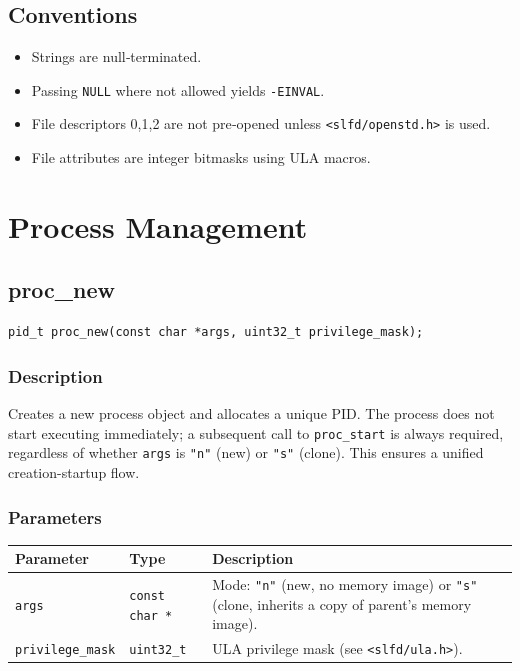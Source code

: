 \documentclass[12pt,a4paper]{article}
\begin{document}
\subsection{Conventions}
\begin{itemize}
    \item Strings are null‑terminated.
    \item Passing \texttt{NULL} where not allowed yields \texttt{-EINVAL}.
    \item File descriptors 0,1,2 are not pre‑opened unless \texttt{<slfd/openstd.h>} is used.
    \item File attributes are integer bitmasks using ULA macros.
\end{itemize}
\section{Process Management}

\subsection{proc\_new}
\begin{lstlisting}
pid_t proc_new(const char *args, uint32_t privilege_mask);
\end{lstlisting}

\subsubsection{Description}
Creates a new process object and allocates a unique PID. The process does not start executing immediately; a subsequent call to \texttt{proc\_start} is always required, regardless of whether \texttt{args} is \texttt{"n"} (new) or \texttt{"s"} (clone). This ensures a unified creation-startup flow.

\subsubsection{Parameters}
\begin{tabularx}{\textwidth}{|l|l|X|}
\hline
\textbf{Parameter} & \textbf{Type} & \textbf{Description} \\
\hline
\verb|args| & \verb|const char *| & Mode: \texttt{"n"} (new, no memory image) or \texttt{"s"} (clone, inherits a copy of parent's memory image). \\
\verb|privilege_mask| & \verb|uint32_t| & ULA privilege mask (see \texttt{<slfd/ula.h>}). \\
\hline
\end{tabularx}
\end{document}
